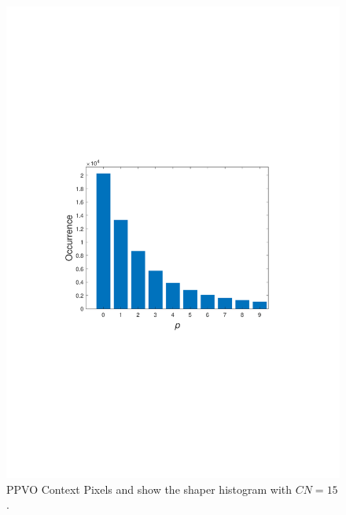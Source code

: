 \documentclass[review,3p,10pt,sort&compress]{elsarticle}
\begin{document}
\begin{figure}
{\begin{minipage}[t]{0.31\linewidth}
    \includegraphics[width=1\textwidth]{figures/PPVO_Lena_CN15_hist.pdf}
    \end{minipage}
}		
\centering
\caption{PPVO Context Pixels and show the shaper histogram with $CN = 15$.}
\label{Fig.PPVOCNandHist}
\end{figure}
\end{document}

